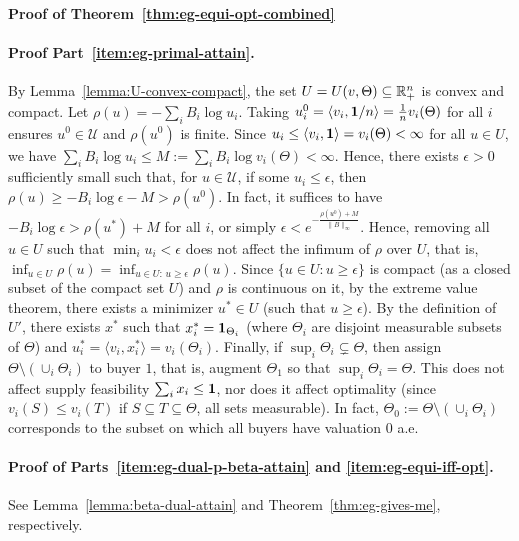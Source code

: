 	\smallskip\noindent\textbf{Proof of Theorem~\ref{thm:eg-equi-opt-combined}}
	\paragraph{Proof Part~\ref{item:eg-primal-attain}.}
	By Lemma~\ref{lemma:U-convex-compact}, the set $U = U(v, \Theta) \subseteq \mathbb{R}_+^n$ is convex and compact. Let $\rho(u) = -\sum_i B_i \log u_i$. Taking $u^0_i = \langle v_i, \mathbf{1}/n \rangle = \frac{1}{n} v_i(\Theta)$ for all $i$ ensures $u^0\in \mathcal{U}$ and $\rho(u^0)$ is finite. Since
	$u_i \leq \langle v_i, \mathbf{1} \rangle = v_i(\Theta) < \infty$
	for all $u\in U$, we have 
	$\sum_i B_i \log u_i \leq M:= \sum_i B_i \log v_i(\Theta) < \infty$.
	Hence, there exists $\epsilon>0$ sufficiently small such that, for $u\in \mathcal{U}$, if some $u_i \leq \epsilon$, then 
	$\rho(u) \geq - B_i \log \epsilon - M > \rho(u^0)$. 
	In fact, it suffices to have $- B_i \log \epsilon > \rho(u^*) + M$ for all $i$, or simply
	$\epsilon < e^{-\frac{\rho(u^0)+M}{\|B\|_\infty}}$.
	Hence, removing all $u\in U$ such that $\min_i u_i < \epsilon$ does not affect the infimum of $\rho$ over $U$, that is, 
	$\inf_{u \in U} \rho(u) = \inf_{u\in U:\, u\geq \epsilon} \rho(u)$.
	Since $\{ u\in U: u\geq \epsilon \}$ is compact (as a closed subset of the compact set $U$) and $\rho$ is continuous on it, by the extreme value theorem, there exists a minimizer $u^*\in U$ (such that $u\geq \epsilon$). 
	By the definition of $U'$, there exists $x^*$ such that $x^*_i = \mathbf{1}_{\Theta_i}$ (where $\Theta_i$ are disjoint measurable subsets of $\Theta$) and
	 $u^*_i = \langle v_i, x^*_i \rangle = v_i(\Theta_i)$.
	Finally, if $\sup_i \Theta_i \subsetneq \Theta$, then assign $\Theta\setminus (\cup_i \Theta_i)$ to buyer $1$, that is, augment $\Theta_1$ so that $\sup_i \Theta_i = \Theta$. This does not affect supply feasibility $\sum_i x_i \leq \mathbf{1}$, nor does it affect optimality (since $v_i(S) \leq v_i(T)$ if $S\subseteq T \subseteq \Theta$, all sets measurable). In fact, $\Theta_0 := \Theta\setminus (\cup_i \Theta_i)$ corresponds to the subset on which all buyers have valuation $0$ a.e.

	\paragraph{Proof of Parts~\ref{item:eg-dual-p-beta-attain} and \ref{item:eg-equi-iff-opt}.} See Lemma~\ref{lemma:beta-dual-attain} and Theorem~\ref{thm:eg-gives-me}, respectively.

